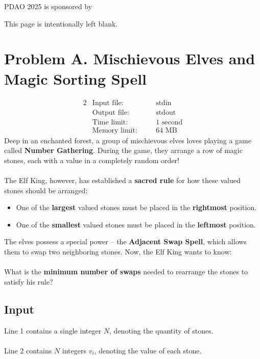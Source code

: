 \documentclass[12pt,a4paper]{article}
\newcommand*{\blankpage}{%
\newpage
\vspace*{\fill}
{\centering \huge This page is intentionally left blank.\par}
\vspace{\fill}
\newpage}
\begin{document}
\noindent\vfill
\begin{minipage}{0.97\textwidth}
 \noindent\hfill PDAO 2025 is sponsored by \textcopyright {}
\end{minipage}

\blankpage

\section*{\fontsize{18}{12}Problem A. Mischievous Elves and Magic Sorting Spell}

\begin{alignat*} {2}
 &   \text{Input file:}   \quad     &&\text{stdin}\\
 &   \text{Output file:}  \quad     &&\text{stdout}\\
 &   \text{Time limit:}   \quad     &&\text{1 second}\\
 &   \text{Memory limit:} \quad     &&\text{64 MB}
\end{alignat*}
\noindent
Deep in an enchanted forest, a group of mischievous elves loves playing a game called \textbf{Number Gathering}. During the game, they arrange a row of magic stones, each with a value in a completely random order!
\\\\
\noindent
The Elf King, however, has established a \textbf{sacred rule} for how these valued stones should be arranged:

\begin{itemize}
    \item One of the \textbf{largest} valued stones must be placed in the \textbf{rightmost} position.
    \item One of the \textbf{smallest} valued stones must be placed in the \textbf{leftmost} position.
\end{itemize}

\noindent
The elves possess a special power -- the \textbf{Adjacent Swap Spell}, which allows them to swap two neighboring stones. Now, the Elf King wants to know:
\\\\
\noindent
What is the \textbf{minimum number of swaps} needed to rearrange the stones to satisfy his rule?

\subsection*{\fontsize{16}{12}Input}
Line 1 contains a single integer $N$, denoting the quantity of stones. \\\\
Line 2 contains $N$ integers $v_i$, denoting the value of each stone. 
\end{document}
